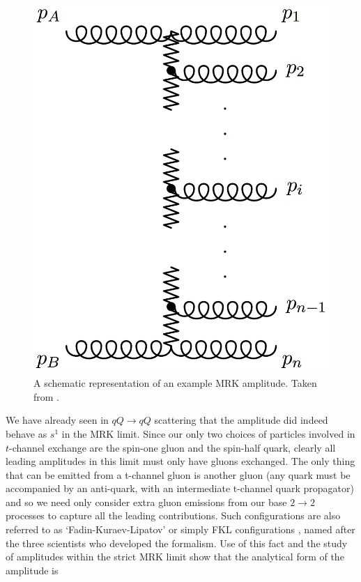 \begin{figure}[t]
\centering
\includegraphics[scale=0.3]{Images/MRK_diagram.png} 
\caption{A schematic representation of an example MRK amplitude. Taken from \cite{Andersen2009a}.}
\label{fig:mrk}
\end{figure}

We have already seen in $qQ \to qQ$ scattering that the amplitude did indeed behave as $s^1$ in the MRK limit. Since our only two choices of particles involved in $t$-channel exchange are the spin-one gluon and the spin-half quark, clearly all leading amplitudes in this limit must only have gluons exchanged. The only thing that can be emitted from a t-channel gluon is another gluon (any quark must be accompanied by an anti-quark, with an intermediate t-channel quark propagator) and so we need only consider extra gluon emissions from our base $2 \to 2$ processes to capture all the leading contributions. Such configurations are also referred to as `Fadin-Kuraev-Lipatov' or simply FKL configurations \cite{Kuraev1976}, named after the three scientists who developed the formalism. Use of this fact and the study of amplitudes within the strict MRK limit \cite{DelDuca1995, Andersen2009a} show that the analytical form of the amplitude is

